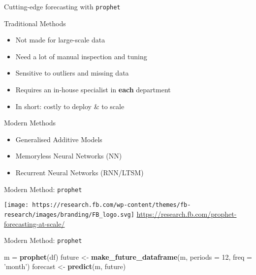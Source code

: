 \documentclass[ignorenonframetext,]{beamer}
\newenvironment{Shaded}{\begin{snugshade}}{\end{snugshade}}
\newcommand{\KeywordTok}[1]{\textcolor[rgb]{0.13,0.29,0.53}{\textbf{#1}}}
\newcommand{\DataTypeTok}[1]{\textcolor[rgb]{0.13,0.29,0.53}{#1}}
\newcommand{\DecValTok}[1]{\textcolor[rgb]{0.00,0.00,0.81}{#1}}
\newcommand{\StringTok}[1]{\textcolor[rgb]{0.31,0.60,0.02}{#1}}
\newcommand{\NormalTok}[1]{#1}
\providecommand{\tightlist}{%
  \setlength{\itemsep}{0pt}\setlength{\parskip}{0pt}}
\begin{document}
\begin{frame}[fragile]{Cutting-edge forecasting with \texttt{prophet}}

\begin{block}{Traditional Methods}

\begin{itemize}
\tightlist
\item
  Not made for large-scale data
\item
  Need a lot of manual inspection and tuning
\item
  Sensitive to outliers and missing data
\item
  Requires an in-house specialist in \textbf{each} department
\item
  In short: costly to deploy \& to scale
\end{itemize}

\end{block}

\begin{block}{Modern Methods}

\begin{itemize}
\tightlist
\item
  Generalised Additive Models
\item
  Memoryless Neural Networks (NN)
\item
  Recurrent Neural Networks (RNN/LTSM)
\end{itemize}

\end{block}

\begin{block}{Modern Method: \texttt{prophet}}

\texttt{[image: https://research.fb.com/wp-content/themes/fb-research/images/branding/FB\_logo.svg]}
\url{https://research.fb.com/prophet-forecasting-at-scale/}

\end{block}

\begin{block}{Modern Method: \texttt{prophet}}

\begin{Shaded}
\begin{Highlighting}[]
\NormalTok{m =}\StringTok{ }\KeywordTok{prophet}\NormalTok{(df)}
\NormalTok{future <-}\StringTok{ }\KeywordTok{make_future_dataframe}\NormalTok{(m, }\DataTypeTok{periods =} \DecValTok{12}\NormalTok{, }\DataTypeTok{freq =} \StringTok{'month'}\NormalTok{)}
\NormalTok{forecast <-}\StringTok{ }\KeywordTok{predict}\NormalTok{(m, future)}
\end{Highlighting}
\end{Shaded}


\end{block}
\end{frame}
\end{document}
